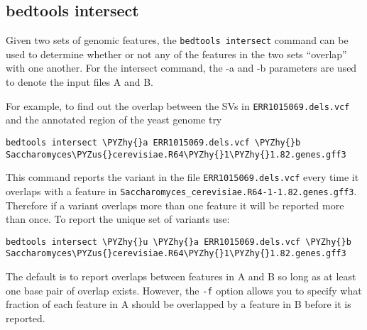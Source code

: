 \documentclass[11pt]{article}
\makeatletter
\def\PYZus{\char`\_}
\def\PYZhy{\char`\-}
\newcommand{\boxspacing}{\kern\kvtcb@left@rule\kern\kvtcb@boxsep}
\newcommand{\prompt}[4]{
        {\ttfamily\llap{{\color{#2}[#3]:\hspace{3pt}#4}}\vspace{-\baselineskip}}
    }
\makeatother
\begin{document}
\hypertarget{bedtools-intersect}{%
\subsection{bedtools intersect}\label{bedtools-intersect}}

Given two sets of genomic features, the \texttt{bedtools\ intersect}
command can be used to determine whether or not any of the features in
the two sets ``overlap'' with one another. For the intersect command,
the -a and -b parameters are used to denote the input files A and B.

For example, to find out the overlap between the SVs in
\texttt{ERR1015069.dels.vcf} and the annotated region of the yeast
genome try

    \begin{tcolorbox}[breakable, size=fbox, boxrule=1pt, pad at break*=1mm,colback=cellbackground, colframe=cellborder]
\prompt{In}{incolor}{ }{\boxspacing}
\begin{Verbatim}[commandchars=\\\{\}]
bedtools intersect \PYZhy{}a ERR1015069.dels.vcf \PYZhy{}b Saccharomyces\PYZus{}cerevisiae.R64\PYZhy{}1\PYZhy{}1.82.genes.gff3
\end{Verbatim}
\end{tcolorbox}

    This command reports the variant in the file
\texttt{ERR1015069.dels.vcf} every time it overlaps with a feature in
\texttt{Saccharomyces\_cerevisiae.R64-1-1.82.genes.gff3}. Therefore if a
variant overlaps more than one feature it will be reported more than
once. To report the unique set of variants use:

    \begin{tcolorbox}[breakable, size=fbox, boxrule=1pt, pad at break*=1mm,colback=cellbackground, colframe=cellborder]
\prompt{In}{incolor}{ }{\boxspacing}
\begin{Verbatim}[commandchars=\\\{\}]
bedtools intersect \PYZhy{}u \PYZhy{}a ERR1015069.dels.vcf \PYZhy{}b Saccharomyces\PYZus{}cerevisiae.R64\PYZhy{}1\PYZhy{}1.82.genes.gff3
\end{Verbatim}
\end{tcolorbox}

    The default is to report overlaps between features in A and B so long as
at least one base pair of overlap exists. However, the \texttt{-f}
option allows you to specify what fraction of each feature in A should
be overlapped by a feature in B before it is reported.
\end{document}
